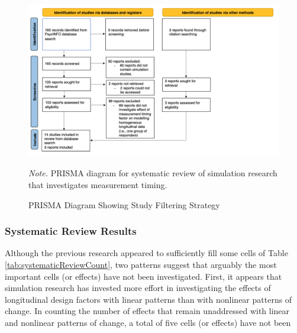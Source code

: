 \documentclass[
  english,
  man,floatsintext]{apa7}
\newcommand{\figurefootnote}{\raggedright\linespread{2}\fontfamily{phv}\fontsize{9.5pt}{11.4pt}\selectfont \textit{Note. }}
\begin{document}
\begin{figure}[H]
  \caption{PRISMA Diagram Showing Study Filtering Strategy}
  \label{fig:prismaDiagram}
  \includegraphics{Figures/prisma_diagram} \hfill{}
    \figurefootnote{PRISMA diagram for systematic review of simulation research that investigates measurement timing.}
\end{figure}

\hypertarget{systematic-review-results}{%
\subsubsection{Systematic Review Results}\label{systematic-review-results}}

Although the previous research appeared to sufficiently fill some cells of Table \ref{tab:systematicReviewCount}, two patterns suggest that arguably the most important cells (or effects) have not been investigated. First, it appears that simulation research has invested more effort in investigating the effects of longitudinal design factors with linear patterns than with nonlinear patterns of change. In counting the number of effects that remain unaddressed with linear and nonlinear patterns of change, a total of five cells (or effects) have not been
\end{document}
